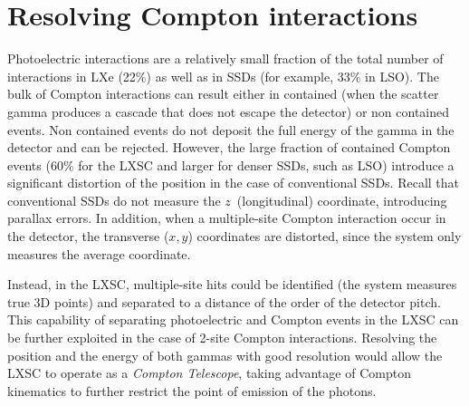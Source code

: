 \section{Resolving Compton interactions}
\label{sec.comp}

Photoelectric interactions are a relatively small fraction of the total number of interactions in LXe (22\%) as well as in SSDs (for example, 33\% in LSO). The bulk of Compton interactions can result either in contained (when the scatter gamma produces a cascade that does not escape the detector) or non contained events. Non contained events do not deposit the full energy of the gamma in the detector and can be rejected. However, the large fraction of contained Compton events (60\% for the LXSC and larger for denser SSDs, such as LSO) introduce a significant distortion of the position in the case of conventional SSDs. Recall that conventional SSDs do not measure the $z$~(longitudinal) coordinate, introducing parallax errors. In addition, when a multiple-site Compton interaction occur in the detector, the transverse ($x,y$) coordinates are distorted, since the system only measures the average coordinate. 

Instead, in the LXSC, multiple-site hits could be identified (the system measures true 3D points) and separated to a distance of the order of the detector pitch. This capability of separating photoelectric and Compton events in the LXSC can be further exploited in the case of 2-site Compton interactions. Resolving the position and the energy of both gammas with good resolution would allow the LXSC to operate as a {\em Compton Telescope}, taking advantage of Compton kinematics to further restrict the point of emission of the photons. 


